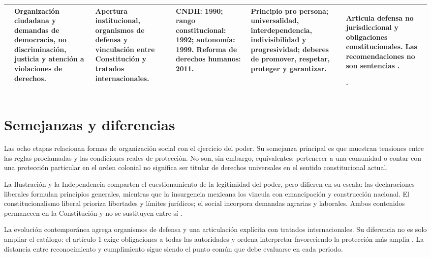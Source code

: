 \documentclass[12pt,spanish,letterpaper,oneside]{article}
\begin{document}
\begin{landscape}
\begin{tabularx}{\linewidth}{|Y|Y|Y|Y|Y|Y|}
& Organizaci\'on ciudadana y demandas de democracia, no discriminaci\'on, justicia y atenci\'on a violaciones de derechos.
& Apertura institucional, organismos de defensa y vinculaci\'on entre Constituci\'on y tratados internacionales.
& CNDH: 1990; rango constitucional: 1992; autonom\'ia: 1999. Reforma de derechos humanos: 2011.
& Principio pro persona; universalidad, interdependencia, indivisibilidad y progresividad; deberes de promover, respetar, proteger y garantizar.
& Articula defensa no jurisdiccional y obligaciones constitucionales. Las recomendaciones no son sentencias \citep[pp.~47--48]{alvarez2009}.\par\citep[arts.~1 y 102 B]{cpeum2026}.\\\hline
\end{tabularx}
\end{landscape}
\clearpage
\pagestyle{plain}
\onehalfspacing

\section*{Semejanzas y diferencias}
Las ocho etapas relacionan formas de organizaci\'on social con el ejercicio
del poder. Su semejanza principal es que muestran tensiones entre las
reglas proclamadas y las condiciones reales de protecci\'on. No son,
sin embargo, equivalentes: pertenecer a una comunidad o contar con una
protecci\'on particular en el orden colonial no significa ser titular de
derechos universales en el sentido constitucional actual.

La Ilustraci\'on y la Independencia comparten el cuestionamiento de la
legitimidad del poder, pero difieren en su escala: las declaraciones liberales
formulan principios generales, mientras que la insurgencia mexicana los
vincula con emancipaci\'on y construcci\'on nacional. El constitucionalismo
liberal prioriza libertades y l\'imites jur\'idicos; el social incorpora demandas
agrarias y laborales. Ambos contenidos permanecen en la Constituci\'on y
no se sustituyen entre s\'i \citep[pp.~1--2]{arteaga}.

La evoluci\'on contempor\'anea agrega organismos de defensa y una
articulaci\'on expl\'icita con tratados internacionales. Su diferencia no es
solo ampliar el cat\'alogo: el art\'iculo 1 exige obligaciones a todas las
autoridades y ordena interpretar favoreciendo la protecci\'on m\'as amplia
\citep[art.~1]{cpeum2026}. La distancia entre reconocimiento y cumplimiento
sigue siendo el punto com\'un que debe evaluarse en cada periodo.
\end{document}
